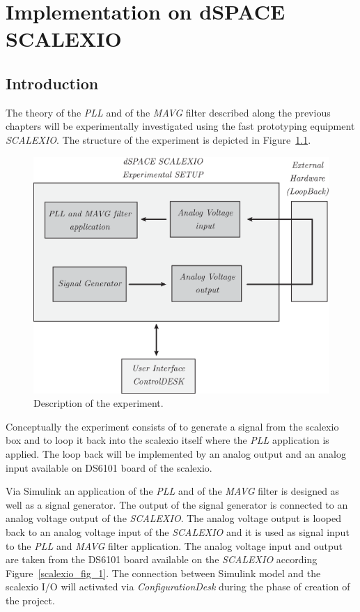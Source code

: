 \documentclass[11pt,a4paper,oneside]{book}
\numberwithin{equation}{section}
\theoremstyle{it}
\theoremstyle{definition}
\begin{document}
	
\chapter{Implementation on dSPACE SCALEXIO}	
\section{Introduction}
The theory of the \textit{PLL} and of the \textit{MAVG} filter described along the previous chapters will be experimentally investigated using the fast prototyping equipment \textit{SCALEXIO}. The structure of the experiment is depicted in Figure~\ref{scalexio_fig_2}. 
\begin{figure}[H]
	\centering
	\includegraphics[width = 320pt, angle = 0, 
	keepaspectratio]{figures/scalexio/hardware_config_2.eps}
	\captionsetup{width=0.5\textwidth, font=small}
	\caption{Description of the experiment.}
	\label{scalexio_fig_2}
\end{figure}
Conceptually the experiment consists of to generate a signal from the scalexio box and to loop it back into the scalexio itself where the \textit{PLL} application is applied. The loop back will be implemented by an analog output and an analog input available on DS6101 board of the scalexio.

Via Simulink an application of the \textit{PLL} and of the \textit{MAVG} filter is designed as well as a signal generator. The output of the signal generator is connected to an analog voltage output of the \textit{SCALEXIO}. The analog voltage output is looped back to an analog voltage input of the \textit{SCALEXIO} and it is used as signal input to the \textit{PLL} and \textit{MAVG} filter application. The analog voltage input and output are taken from the DS6101 board available on the \textit{SCALEXIO} according Figure~\ref{scalexio_fig_1}. The connection between Simulink model and the scalexio I/O will activated via \textit{ConfigurationDesk} during the phase of creation of the project.
\end{document}
